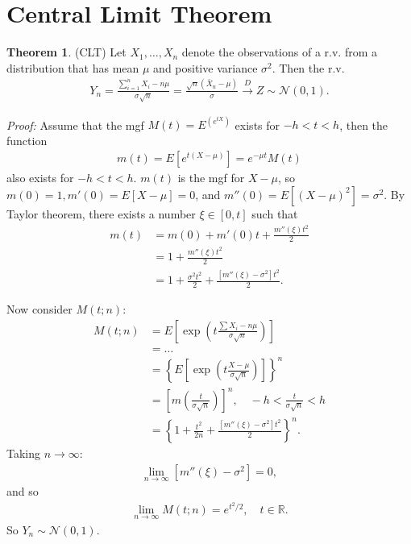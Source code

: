\documentclass{book}
\theoremstyle{definition}
\newtheorem{thm}{Theorem}[section]
\newcommand{\nn}{\nonumber}
\newcommand{\N}{\mathcal{N}}
\newcommand{\f}[2]{\frac{#1}{#2}}
\newcommand{\lp}{\left(}
\newcommand{\rp}{\right)}
\newcommand{\lb}{\left[}
\newcommand{\rb}{\right]}
\newcommand{\lc}{\left\{}
\newcommand{\rc}{\right\}}
\begin{document}
\section{Central Limit Theorem}

\begin{thm} (CLT) Let $X_1, \dots, X_n$ denote the observations of a r.v. from a distribution that has mean $\mu$ and positive variance $\sigma^2$. Then the r.v.
\begin{align}
Y_n = \f{\sum^n_{i=1}X_i - n\mu }{\sigma\sqrt{n}} = \f{\sqrt{n}(\bar{X}_n - \mu)}{\sigma} \xrightarrow{D} Z \sim \N(0,1).
\end{align}
\end{thm}

\noindent \textit{Proof:} Assume that the mgf $M(t) = E^(e^{tX})$ exists for $-h < t <  h$, then the function
\begin{align}
m(t) = E[e^{t(X-\mu)}] = e^{-\mu t}M(t)
\end{align}
also exists for $-h < t < h$. $m(t)$ is the mgf for $X-\mu$, so $m(0) = 1, m'(0) = E[X-\mu] = 0$, and $m''(0) = E[(X-\mu)^2] = \sigma^2$. By Taylor theorem, there exists a number $\xi \in [0,t]$ such that
\begin{align}
m(t) &= m(0) + m'(0)t + \f{m''(\xi)t^2}{2} \nn\\
&= 1 + \f{m''(\xi)t^2}{2}\nn\\
&= 1 + \f{\sigma^2 t^2}{2} + \f{[m''(\xi) - \sigma^2]t^2}{2}.
\end{align}

Now consider $M(t;n)$:
\begin{align}
M(t;n) &= E\lb \exp\lp  t\f{\sum X_i - n\mu}{\sigma\sqrt{n}} \rp \rb\nn\\
&= \dots\nn\\
&= \lc E\lb \exp\lp t\f{X - \mu}{\sigma \sqrt{n}} \rp \rb \rc^n\nn\\
&= \lb m\lp \f{t}{\sigma\sqrt{n}} \rp \rb^n, \quad -h < \f{t}{\sigma\sqrt{n}} < h\nn\\
&= \lc 1+ \f{t^2}{2n} + \f{[m''(\xi) - \sigma^2]t^2}{2} \rc^n.
\end{align}
Taking $n\to \infty$:
\begin{align}
\lim_{n\to \infty} [m''(\xi) - \sigma^2] = 0,
\end{align}
and so
\begin{align}
\lim_{n\to \infty} M(t;n) = e^{t^2/2}, \quad t \in \mathbb{R}.
\end{align}
So ${Y_n} \sim \N(0,1) $.
\end{document}
